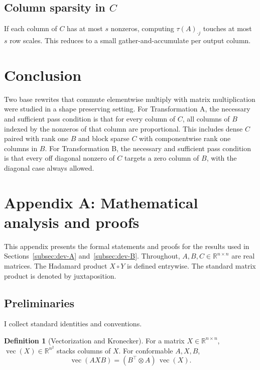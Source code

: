 \documentclass[11pt,a4paper]{article}
\theoremstyle{definition}
\newtheorem{definition}[theorem]{Definition}
\newcommand{\R}{\mathbb{R}}
\newcommand{\Had}{\circ}
\newcommand{\vecop}{\operatorname{vec}}
\begin{document}
\subsection{Column sparsity in $C$}\label{sec:ext-sparse}
If each column of $C$ has at most $s$ nonzeros, computing $\tau(A)_{\cdot j}$ touches at most $s$ row scales. This reduces to a small gather-and-accumulate per output column.

\vspace{3cm}


\section{Conclusion}
\label{sec:conclusion}
Two base rewrites that commute elementwise multiply with matrix multiplication were studied in a shape preserving setting. For Transformation A, the necessary and sufficient pass condition is that for every column of $C$, all columns of $B$ indexed by the nonzeros of that column are proportional. This includes dense $C$ paired with rank one $B$ and block sparse $C$ with componentwise rank one columns in $B$. For Transformation B, the necessary and sufficient pass condition is that every off diagonal nonzero of $C$ targets a zero column of $B$, with the diagonal case always allowed.

\clearpage


\appendix
\section{Appendix A: Mathematical analysis and proofs}
\label{app:math}

This appendix presents the formal statements and proofs for the results used in Sections~\ref{subsec:dev-A} and~\ref{subsec:dev-B}. Throughout, $A,B,C\in\R^{n\times n}$ are real matrices. The Hadamard product $X\Had Y$ is defined entrywise. The standard matrix product is denoted by juxtaposition.

\subsection{Preliminaries}
I collect standard identities and conventions.

\begin{definition}[Vectorization and Kronecker]
For a matrix $X\in\R^{n\times n}$, $\vecop(X)\in\R^{n^2}$ stacks columns of $X$. For conformable $A,X,B$,
\[
\vecop(AXB)=(B^\top\!\otimes A)\,\vecop(X).
\]
\end{definition}
\end{document}
